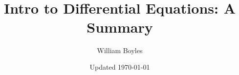 


	\title{Intro to Differential Equations: A Summary}
	\author{William Boyles}
	\date{Updated \today}
		
	\frontmatter
		\maketitle
		\tableofcontents
	
	\mainmatter
		
	\appendix
		
	\backmatter


